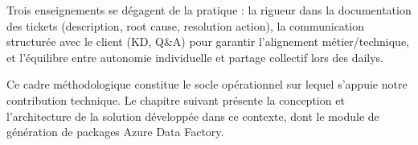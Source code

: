 Trois enseignements se dégagent de la pratique : la rigueur dans la documentation des tickets (description, root cause, resolution action), la communication structurée avec le client (KD, Q\&A) pour garantir l'alignement métier/technique, et l'équilibre entre autonomie individuelle et partage collectif lors des dailys.

Ce cadre méthodologique constitue le socle opérationnel sur lequel s'appuie notre contribution technique. Le chapitre suivant présente la conception et l'architecture de la solution développée dans ce contexte, dont le module de génération de packages Azure Data Factory.